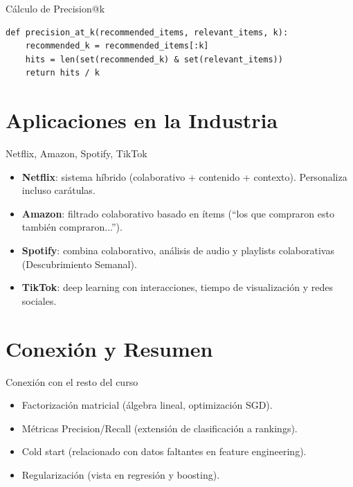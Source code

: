 \documentclass[aspectratio=169, 10pt, xcolor=table]{beamer}
\begin{document}
\begin{frame}[fragile]{Cálculo de Precision@k}
    \begin{lstlisting}
def precision_at_k(recommended_items, relevant_items, k):
    recommended_k = recommended_items[:k]
    hits = len(set(recommended_k) & set(relevant_items))
    return hits / k
    \end{lstlisting}
\end{frame}

\section{Aplicaciones en la Industria}

\begin{frame}{Netflix, Amazon, Spotify, TikTok}
    \begin{itemize}
        \item \textbf{Netflix}: sistema híbrido (colaborativo + contenido + contexto). Personaliza incluso carátulas.
        \item \textbf{Amazon}: filtrado colaborativo basado en ítems (``los que compraron esto también compraron...'').
        \item \textbf{Spotify}: combina colaborativo, análisis de audio y playlists colaborativas (Descubrimiento Semanal).
        \item \textbf{TikTok}: deep learning con interacciones, tiempo de visualización y redes sociales.
    \end{itemize}
\end{frame}

\section{Conexión y Resumen}

\begin{frame}{Conexión con el resto del curso}
    \begin{itemize}
        \item Factorización matricial (álgebra lineal, optimización SGD).
        \item Métricas Precision/Recall (extensión de clasificación a rankings).
        \item Cold start (relacionado con datos faltantes en feature engineering).
        \item Regularización (vista en regresión y boosting).
    \end{itemize}
\end{frame}
\end{document}
